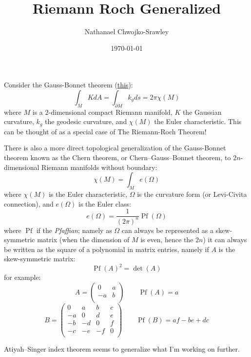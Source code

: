 \documentclass{book}
\title{Riemann Roch Generalized}
\author{Nathanael Chwojko-Srawley}
\date{\today}
\newcommand{\Pf}{{\operatorname{Pf}}}
\newcommand{\qn}{\quad\newline}
\begin{document}
\maketitle
\tableofcontents

\qn
\qn

Consider the Gauss-Bonnet theorem (\href{https://en.wikipedia.org/wiki/Gauss%E2%80%93Bonnet_theorem}{this}):
\[
  \int_M KdA = \int_{\partial M}k_g ds = 2\pi \chi(M)
\]
where $M$ is a $2$-dimensional compact Riemann manifold, $K$ the Gaussian curvature, $k_g$ the geodesic
curvature, and $\chi(M)$ the Euler characteristic. This can be thought of as a special case of The
Riemann-Roch Theorem!

There is also a more direct topological generalization of the Gauss-Bonnet theorem known as the Chern theorem,
or Chern–Gauss–Bonnet theorem, to $2n$-dimensional Riemann manifolds without boundary:
\[
  \chi(M) = \int_M e(\Omega)
\]
where $\chi(M)$ is the Euler characteristic, $\Omega$ is the curvature form (or Levi-Civita connection), and
$e(\Omega)$ is the Euler class:
\[
  e(\Omega) = \frac{1}{(2\pi)^n}\operatorname{Pf}(\Omega)
\]
where $\operatorname{Pf}$ if the \emph{Pfaffian}; namely as $\Omega$ can always be represented as
a skew-symmetric matrix (when the dimension of $M$ is even, hence the $2n$) it can always be written as the
square of a polynomial in matrix entries, namely if $A$ is the skew-symmetric matrix:
\[
  \operatorname{Pf}(A)^2 = \det(A)
\]
for example:
\[
  A = \begin{pmatrix}
  0 & a\\
  -a & b\\
  \end{pmatrix} \qquad \Pf(A) = a
\]
\[
  B = \begin{pmatrix}
  0 & a & b & c\\
  -a & 0 & d & e\\
  -b & -d & 0 & f\\
  -c & -e & -f & 0\\
  \end{pmatrix} \qquad \Pf(B) = af-be+dc
\]


Atiyah–Singer index theorem seems to generalize what I'm working on further.
\end{document}
